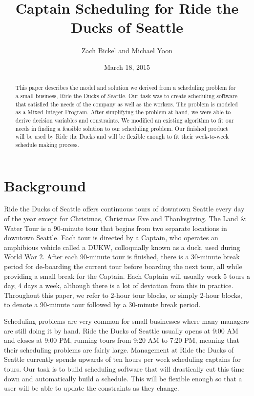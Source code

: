 \documentclass[12pt]{article}
\begin{document}
\title{Captain Scheduling for Ride the Ducks of Seattle} 

\author{Zach Bickel and Michael Yoon}
\date{March 18, 2015}
\maketitle

\begin{abstract}
This paper describes the model and solution we derived from a scheduling problem for a 
small business, Ride the Ducks of Seattle. Our task was to create scheduling 
software that satisfied the needs of the 
company as well as the workers. The problem is modeled as a Mixed Integer Program. After simplifying the problem at hand, we were able to derive decision variables and constraints. We modified an existing algorithm to fit our needs in finding a feasible solution to our scheduling problem. Our finished product will be used 
by Ride the Ducks and will be flexible enough to fit their week-to-week 
schedule making process.
\end{abstract}


\section*{Background}
Ride the Ducks of Seattle offers continuous tours of downtown Seattle every day of the year except for Christmas, Christmas Eve and Thanksgiving. The Land \& Water Tour is a 90-minute tour that begins from two separate locations in downtown Seattle. Each tour is directed by a Captain, who operates an amphibious vehicle called a DUKW, colloquially known as a duck, used during World War 2. After each 90-minute tour is finished, there is a 30-minute break period for de-boarding the current tour before boarding the next tour, all while providing a small break for the Captain. Each Captain will usually work 5 tours a day, 4 days a week, although there is a lot of deviation from this in practice. Throughout this paper, we refer to 2-hour tour blocks, or simply 2-hour blocks, to denote a 90-minute tour followed by a 30-minute break period.


Scheduling problems are very common for small businesses where many managers are still doing it by hand. Ride the Ducks of Seattle usually opens at 9:00 AM and closes at 9:00 PM, running tours from 9:20 AM to 7:20 PM, meaning that their scheduling problems are fairly large. Management at Ride the Ducks of Seattle currently spends upwards of ten hours per week scheduling captains for tours. Our task is to build scheduling software that will drastically cut this time down and automatically build a schedule. This will be flexible enough so that a user will be able to update the constraints as they change. 
\end{document}
